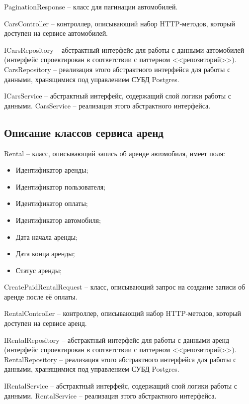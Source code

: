 PaginationResponse -- класс для пагинации автомобилей.

CarsController -- контроллер, описывающий набор HTTP-методов, который доступен на сервисе автомобилей.

ICarsRepository -- абстрактный интерфейс для работы с данными автомобилей (интерфейс спроектирован в соответствии с паттерном <<репозиторий>>). CarsRepository -- реализация этого абстрактного интерфейса для работы с данными, хранящимися под управлением СУБД Postgres.

ICarsService -- абстрактный интерфейс, содержащий слой логики работы с данными. CarsService -- реализация этого абстрактного интерфейса.

\subsection*{Описание классов сервиса аренд}

Rental -- класс, описывающий запись об аренде автомобиля, имеет поля:

\begin{itemize}
	\item Идентификатор аренды;
	
	\item Идентификатор пользователя;
	
	\item Идентификатор оплаты;
	
	\item Идентификатор автомобиля;
	
	\item Дата начала аренды;
	
	\item Дата конца аренды;
	
	\item Статус аренды;
\end{itemize}

CreatePaidRentalRequest -- класс, описывающий запрос на создание записи об аренде после её оплаты.

RentalController -- контроллер, описывающий набор HTTP-методов, который доступен на сервисе аренд.

IRentalRepository -- абстрактный интерфейс для работы с данными аренд (интерфейс спроектирован в соответствии с паттерном <<репозиторий>>). RentalRepository -- реализация этого абстрактного интерфейса для работы с данными, хранящимися под управлением СУБД Postgres.

IRentalService -- абстрактный интерфейс, содержащий слой логики работы с данными. RentalService -- реализация этого абстрактного интерфейса.

